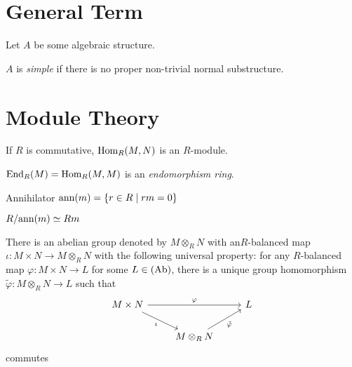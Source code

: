 \documentclass{article}
\begin{document}
\maketitle
\vspace{1pt}

\section*{General Term}

\begin{definition}
  Let \(A\) be some algebraic structure.

  \(A\) is \emph{simple}
  if there is no proper non-trivial normal substructure.
\end{definition}

\section*{Module Theory}

\begin{lemma}
  If \(R\) is commutative, \(\textnormal{Hom}_R(M, N)\) is an \(R\)-module.
\end{lemma}

\begin{definition}
  \(\textnormal{End}_R(M) = \textnormal{Hom}_R(M, M)\) is an \emph{endomorphism ring}.
\end{definition}

\begin{definition}
  Annihilator
  \(\textnormal{ann}(m) = \{r \in R \mid rm = 0\}\)
\end{definition}

\begin{lemma}
  \(R/\textnormal{ann}(m) \simeq Rm\)
\end{lemma}

\begin{theorem}
  There is an abelian group denoted by \(M \otimes_R N\)
  with an\(R\)-balanced map \(\iota: M \times N \to M \otimes_R N\)
  with the following universal property:
  for any \(R\)-balanced map \(\varphi: M \times N \to L\)
  for some \(L \in (\textnormal{Ab})\),
  there is a unique group homomorphism \(\tilde\varphi: M \otimes_R N \to L\)
  such that
  \[\begin{tikzcd}
    M \times N \ar[swap,"\iota"]{rd} \ar["\varphi"]{rr} & & L \\
    & M \otimes_R N \ar[swap, "\tilde\varphi"]{ru}
  \end{tikzcd}\]
  commutes
\end{theorem}
\end{document}
